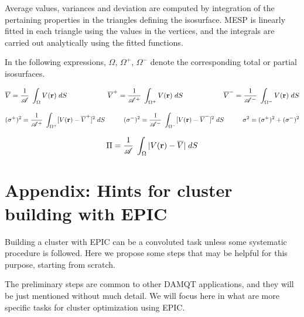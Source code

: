 \documentclass[10pt]{article}
\begin{document}
Average values, variances and deviation are computed by integration of the pertaining properties in the triangles defining the isosurface. MESP is linearly fitted in each triangle using the values in the vertices, and the integrals are carried out analytically using the fitted functions.

In the following expressions, $\Omega$, $\Omega^+$, $\Omega^-$ denote the corresponding total or partial isosurfaces.

$$
\overline{V} = \frac{1}{\mathscr{A}} \; \int_\Omega V({\bf r}) \; dS
\hspace*{2cm}
\overline{V}^+ = \frac{1}{\mathscr{A}^+} \; \int_{\Omega^+} V({\bf r}) \; dS
\hspace*{2cm}
\overline{V}^- = \frac{1}{\mathscr{A}^-} \; \int_{\Omega^-} V({\bf r}) \; dS
$$

$$
(\sigma^+)^2 = \frac{1}{\mathscr{A}^+} \; \int_{\Omega^+} [V({\bf r}) - \overline{V}^+]^2 \; dS
\hspace*{1cm}
(\sigma^-)^2 = \frac{1}{\mathscr{A}^-} \; \int_{\Omega^-} [V({\bf r}) - \overline{V}^-]^2 \; dS
\hspace*{1cm}
\sigma^2 = (\sigma^+)^2 + (\sigma^-)^2
$$

$$
\Pi = \frac{1}{\mathscr{A}} \; \int_\Omega | V({\bf r}) - \overline{V}| \; dS
$$


\section{Appendix: Hints for cluster building with EPIC\label{A6}}

Building a cluster with EPIC can be a convoluted task unless some systematic
procedure is followed. Here we propose some steps that may be helpful 
for this purpose, starting from scratch.

The preliminary steps are common to other DAMQT applications, and they will be
just mentioned without much detail. We will focus here in what are more 
specific tasks for cluster optimization using EPIC.
\end{document}
